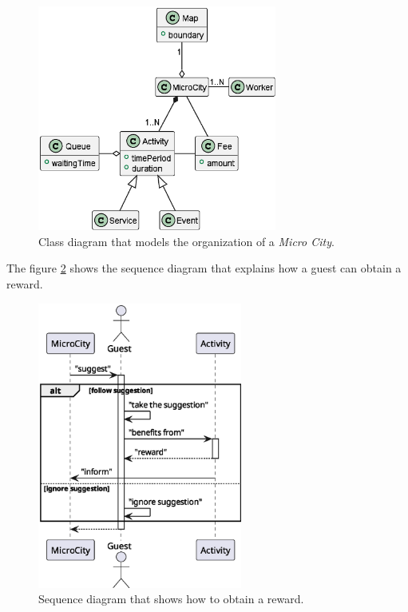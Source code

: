 \begin{figure}[H]
    \centering
    \includegraphics[width=0.7\textwidth]{./img/micro_city-0}
    \caption{Class diagram that models the organization of a \textit{Micro City}.}
    \label{fig:micro-city}
\end{figure}

\newpage

The figure \ref{fig:reward} shows the sequence diagram that explains how a guest can obtain a reward.

\begin{figure}[H]
    \centering
    \includegraphics[width=0.6\textwidth]{./img/reward-0}
    \caption{Sequence diagram that shows how to obtain a reward.}
    \label{fig:reward}
\end{figure}

\newpage
